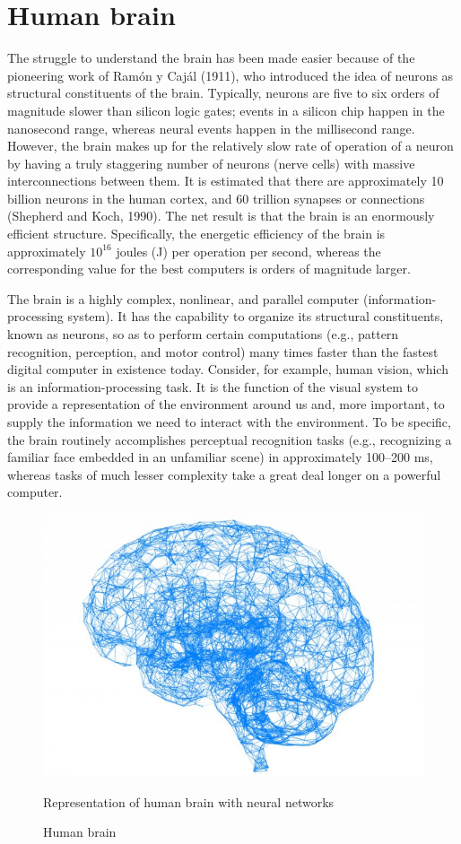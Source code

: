 \documentclass[12pt]{article}
\begin{document}
\section{\fontsize{14}{14}\selectfont Human brain}
\par The struggle to understand the brain has been made easier because of the pioneering work of Ramón y Cajál (1911), who introduced the idea of neurons as structural constituents of the brain. Typically, neurons are five to six orders of magnitude slower than silicon logic gates; events in a silicon chip happen in the nanosecond range, whereas neural events happen in the millisecond range. However, the brain makes up for the relatively slow rate of operation of a neuron by having a truly staggering number of neurons (nerve cells) with massive interconnections between them. It is estimated that there are approximately 10 billion neurons in the human cortex, and 60 trillion synapses or connections (Shepherd and Koch, 1990). The net result is that the brain is an enormously efficient structure. Specifically, the energetic efficiency
of the brain is approximately $10^16$ joules (J) per operation per second, whereas the corresponding value for the best computers is orders of magnitude larger. 

The brain is a highly complex, nonlinear, and parallel computer
(information-processing system). It has the capability to organize its structural constituents, known as neurons, so as to perform certain computations (e.g., pattern recognition, perception, and motor control) many times faster than the fastest digital computer in existence today. Consider, for example, human vision, which is an information-processing task. It is the function of the visual system to provide a representation of the environment around us and, more important, to supply the information we need to interact with the environment. To be specific, the brain routinely accomplishes perceptual recognition tasks (e.g., recognizing a familiar face embedded in an unfamiliar scene) in approximately 100–200 ms, whereas tasks of much lesser complexity take a great deal longer on a powerful computer.


\begin{figure}[h]
    \centering
    \includegraphics[width=0.25 \textwidth]{brain.jpg}
    \caption{Human brain}
    \label{fig:mesh1}
    Representation of human brain with neural networks 
\end{figure}
\end{document}
